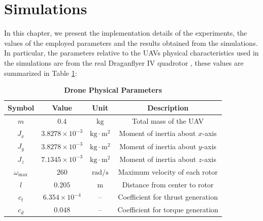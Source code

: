 \documentclass[main]{subfiles}
\begin{document}
\section{Simulations}
In this chapter, we present the implementation details of the experiments,
the values of the employed parameters and the results obtained from the simulations.
In particular, the parameters relative to the UAVs physical
characteristics used in the simulations are from 
the real Draganflyer IV quadrotor \cite{drone}, these values are
summarized in Table \ref{tab:drone_parameters}:
\begin{table}[H]
\centering
\caption{\textbf{Drone Physical Parameters}}
\begin{tabular}{c c c c}
\hline\hline
\textbf{Symbol}     & \textbf{Value}       & \textbf{Unit}         & \textbf{Description} \\ \hline\hline
\(m\)               & \(0.4\)              & \(\text{kg}\)          & Total mass of the UAV \\
\(J_x\)             & \(3.8278 \times 10^{-3}\) & \(\text{kg}\cdot\text{m}^2\) & Moment of inertia about $x$-axis \\
\(J_y\)             & \(3.8278 \times 10^{-3}\) & \(\text{kg}\cdot\text{m}^2\) & Moment of inertia about $y$-axis \\
\(J_z\)             & \(7.1345 \times 10^{-3}\) & \(\text{kg}\cdot\text{m}^2\) & Moment of inertia about $z$-axis \\
$\omega_\text{max}$ &$260$                  &$\text{rad/s}$                    & Maximum  velocity of each rotor\\
\(l\)               & \(0.205\)            & \(\text{m}\)           & Distance from center to rotor \\
\(c_t\)             & \(6.354 \times 10^{-4}\) & --                     & Coefficient for thrust generation \\
\(c_d\)             & \(0.048\)            & --                     & Coefficient for torque generation \\
\hline\hline
\end{tabular}
\label{tab:drone_parameters}
\end{table}
\end{document}

